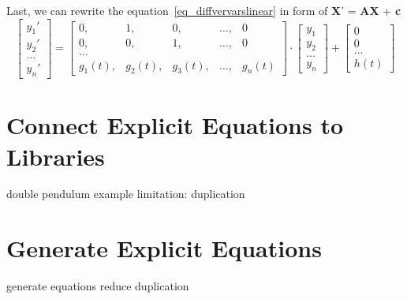 Last, we can rewrite the equation~\ref{eq_diffvervarslinear} in form of \textbf{X}' = \textbf{AX} + \textbf{c}
\begin{equation}
	\begin{bmatrix}
		y_{1}' \\
        y_{2}' \\
        \dots  \\
        y_{n}'
	\end{bmatrix}
    = 
    \begin{bmatrix}
		0, & 1, & 0, & \dots, & 0 \\
        0, & 0, & 1, & \dots, & 0 \\
        \dots \\
        g_{1}(t), & g_{2}(t), & g_{3}(t), & \dots, & g_{n}(t)
	\end{bmatrix}
    \cdot
    \begin{bmatrix}
		y_{1} \\
        y_{2} \\
        \dots  \\
        y_{n}
	\end{bmatrix}
    + 
    \begin{bmatrix}
		0 \\
        0 \\
        \dots  \\
        h(t)
	\end{bmatrix}
\end{equation}

\section{Connect Explicit Equations to Libraries}
double pendulum example
limitation: duplication

\section{Generate Explicit Equations}
generate equations
reduce duplication

